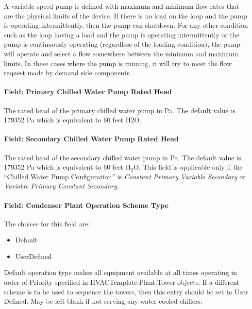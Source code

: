 A variable speed pump is defined with maximum and minimum flow rates that are the physical limits of the device. If there is no load on the loop and the pump is operating intermittently, then the pump can shutdown. For any other condition such as the loop having a load and the pump is operating intermittently or the pump is continuously operating (regardless of the loading condition), the pump will operate and select a flow somewhere between the minimum and maximum limits. In these cases where the pump is running, it will try to meet the flow request made by demand side components.

\paragraph{Field: Primary Chilled Water Pump Rated Head}\label{field-primary-chilled-water-pump-rated-head}

The rated head of the primary chilled water pump in Pa. The default value is 179352 Pa which is equivalent to 60 feet H2O.

\paragraph{Field: Secondary Chilled Water Pump Rated Head}\label{field-secondary-chilled-water-pump-rated-head}

The rated head of the secondary chilled water pump in Pa. The default value is 179352 Pa which is equivalent to 60 feet H\(_{2}\)O. This field is applicable only if the ``Chilled Water Pump Configuration'' is \emph{Constant Primary Variable Secondary} or \emph{Variable Primary Constant Secondary}.

\paragraph{Field: Condenser Plant Operation Scheme Type}\label{field-condenser-plant-operation-scheme-type}

The choices for this field are:

\begin{itemize}
\item
  Default
\item
  UserDefined
\end{itemize}

Default operation type makes all equipment available at all times operating in order of Priority specified in HVACTemplate:Plant:Tower objects. If a different scheme is to be used to sequence the towers, then this entry should be set to User Defined. May be left blank if not serving any water cooled chillers.


